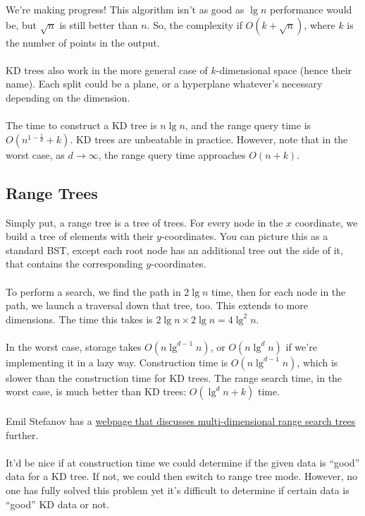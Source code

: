 \documentclass[]{article}
\theoremstyle{definition}
\begin{document}
			We're making progress! This algorithm isn't as good as $\lg n$ performance would be, but $\sqrt{n}$ is still better than $n$. So, the complexity if $O(k + \sqrt{n})$, where $k$ is the number of points in the output.
			\\ \\
			KD trees also work in the more general case of $k$-dimensional space (hence their name). Each split could be a plane, or a hyperplane \textendash{} whatever's necessary depending on the dimension.
			\\ \\
			The time to construct a KD tree is $n \lg n$, and the range query time is $O(n^{1 - \frac{1}{d}} + k)$. KD trees are unbeatable in practice. However, note that in the worst case, as $d \to \infty$, the range query time approaches $O(n + k)$.

		\subsection{Range Trees}
			Simply put, a range tree is a tree of trees. For every node in the $x$ coordinate, we build a tree of elements with their $y$-coordinates. You can picture this as a standard BST, except each root node has an additional tree out the side of it, that contains the corresponding $y$-coordinates.
			\\ \\
			To perform a search, we find the path in $2 \lg n$ time, then for each node in the path, we launch a traversal down that tree, too. This extends to more dimensions. The time this takes is $2 \lg n \times 2 \lg n = 4 \lg^2 n$.
			\\ \\
			In the worst case, storage takes $O(n \lg^{d - 1} n)$, or $O(n \lg^d n)$ if we're implementing it in a lazy way. Construction time is $O(n \lg^{d - 1} n)$, which is slower than the construction time for KD trees. The range search time, in the worst case, is much better than KD trees: $O(\lg^d n + k)$ time.
			\\ \\
			Emil Stefanov has a \href{http://www.emilstefanov.net/Projects/RangeSearchTree.aspx}{webpage that discusses multi-dimensional range search trees} further.
			\\ \\
			It'd be nice if at construction time we could determine if the given data is ``good'' data for a KD tree. If not, we could then switch to range tree mode. However, no one has fully solved this problem yet \textendash{} it's difficult to determine if certain data is ``good'' KD data or not.
	
\end{document}
